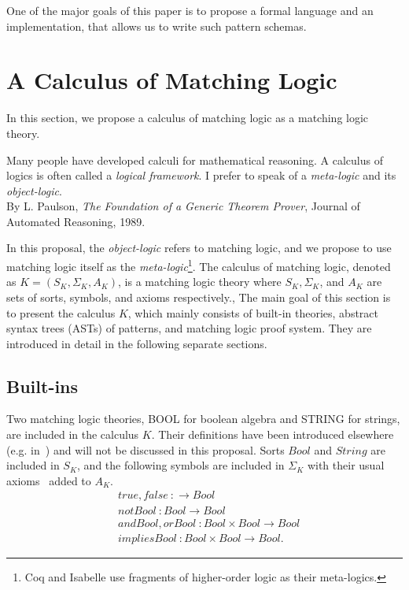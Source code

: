 \documentclass[UTF8]{article}
\theoremstyle{plain}
\theoremstyle{definition}
\theoremstyle{remark}
\begin{document}
One of the major goals of this paper is to propose a formal language
and an implementation, that allows us to write such pattern schemas.

\section{A Calculus of Matching Logic}
In this section, we propose a calculus of matching logic as a matching logic 
theory. 
\begin{displayquote}
	Many people have developed calculi for mathematical reasoning. 
	A calculus of logics is often called a \emph{logical framework}.
	I prefer to speak of a \emph{meta-logic} and its \emph{object-logic}. \\
	By L. Paulson, \textit{The Foundation of a Generic Theorem Prover},
	Journal of Automated Reasoning, 1989.
\end{displayquote}
In this proposal, the \emph{object-logic} refers to matching logic,
and we propose to use matching logic itself as the 
\emph{meta-logic}\footnote{Coq and Isabelle use 
fragments of higher-order logic as their meta-logics.}. 
The calculus of matching logic, denoted as $K = (S_K, \Sigma_K, A_K)$, is 
a matching logic theory
where $S_K, \Sigma_K$, and $A_K$ are sets of sorts, symbols, and axioms respectively.,
The main goal of this section is to present the calculus $K$, which mainly 
consists of built-in theories, abstract syntax trees (ASTs) of patterns, and 
matching logic proof system. 
They are introduced in detail in the following separate sections.
\subsection{Built-ins}
Two matching logic theories, {\small BOOL} for boolean algebra and {\small 
STRING} for strings, are included in the calculus $K$. 
Their definitions have been introduced elsewhere (e.g. in~\cite{???}) and will not be discussed in this proposal. 
Sorts $\mathit{Bool}$ and $\mathit{String}$ are included in $S_K$, and the following symbols are included in $\Sigma_K$ with their usual axioms~\cite{?} added to $A_K$.
\begin{align*}
&\mathit{true}, \mathit{false} \ \colon \to \mathit{Bool} \\
&\mathit{notBool} \ \colon \mathit{Bool} \to \mathit{Bool} \\
&\mathit{andBool}, \mathit{orBool} \ \colon \mathit{Bool} \times 
\mathit{Bool} \to \mathit{Bool}\\
&\mathit{impliesBool} \ \colon \mathit{Bool} \times \mathit{Bool} \to 
\mathit{Bool}.
\end{align*}
\end{document}
